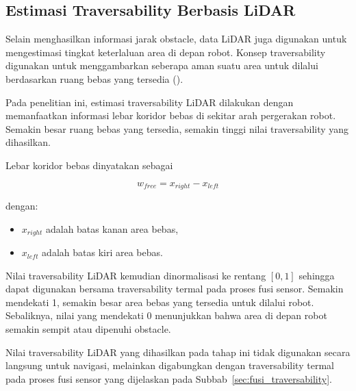 \subsection{Estimasi Traversability Berbasis LiDAR}

Selain menghasilkan informasi jarak obstacle, data LiDAR juga digunakan untuk mengestimasi tingkat keterlaluan area di depan robot. Konsep traversability digunakan untuk mengg\-ambarkan seberapa aman suatu area untuk dilalui berdasarkan ruang bebas yang tersedia (\cite{Sevastopoulos2022}).

Pada penelitian ini, estimasi traversability LiDAR dilakukan dengan memanfaatkan informasi lebar koridor bebas di sekitar arah pergerakan robot. Semakin besar ruang bebas yang tersedia, semakin tinggi nilai traversability yang dihasilkan.

Lebar koridor bebas dinyatakan sebagai

\begin{equation}
w_{free}=x_{right}-x_{left}
\label{eq:free_width}
\end{equation}

dengan:

\begin{itemize}
\item $x_{right}$ adalah batas kanan area bebas,
\item $x_{left}$ adalah batas kiri area bebas.
\end{itemize}

Nilai traversability LiDAR kemudian dinormalisasi ke rentang $[0,1]$ sehingga dapat digunakan bersama traversability termal pada proses fusi sensor. Semakin mendekati 1, semakin besar area bebas yang tersedia untuk dilalui robot. Sebaliknya, nilai yang mendekati 0 menunjukkan bahwa area di depan robot semakin sempit atau dipenuhi obstacle.

Nilai traversability LiDAR yang dihasilkan pada tahap ini tidak digunakan secara langsung untuk navigasi, melainkan digabungkan dengan traversability termal pada proses fusi sensor yang dijelaskan pada Subbab~\ref{sec:fusi_traversability}.

